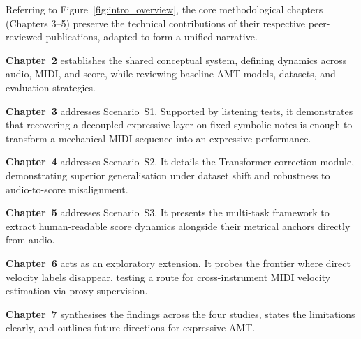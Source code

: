 Referring to Figure~\ref{fig:intro_overview}, the core methodological chapters (Chapters 3--5) preserve the technical contributions of their respective peer-reviewed publications, adapted to form a unified narrative.

\textbf{Chapter~2} establishes the shared conceptual system, defining dynamics across audio, MIDI, and score, while reviewing baseline AMT models, datasets, and evaluation strategies.

\textbf{Chapter~3} addresses Scenario~S1. Supported by listening tests, it demonstrates that recovering a decoupled expressive layer on fixed symbolic notes is enough to transform a mechanical MIDI sequence into an expressive performance.

\textbf{Chapter~4} addresses Scenario~S2. It details the Transformer correction module, demonstrating superior generalisation under dataset shift and robustness to audio-to-score misalignment.

\textbf{Chapter~5} addresses Scenario~S3. It presents the multi-task framework to extract human-readable score dynamics alongside their metrical anchors directly from audio.

\textbf{Chapter~6} acts as an exploratory extension. It probes the frontier where direct velocity labels disappear, testing a route for cross-instrument MIDI velocity estimation via proxy supervision.

\textbf{Chapter~7} synthesises the findings across the four studies, states the limitations clearly, and outlines future directions for expressive AMT.
